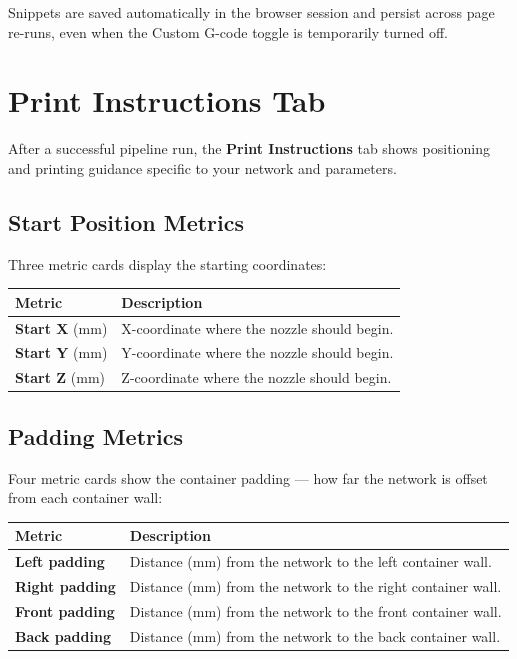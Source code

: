 \documentclass[11pt,letterpaper]{article}
\newcommand{\gui}[1]{\textcolor{guicolor}{\textsf{\textbf{#1}}}}
\begin{document}
\begin{tipbox}
Snippets are saved automatically in the browser session and persist across
page re-runs, even when the Custom G-code toggle is temporarily turned off.
\end{tipbox}

\section{Print Instructions Tab}
\label{sec:instructions}

After a successful pipeline run, the \gui{Print Instructions} tab shows
positioning and printing guidance specific to your network and parameters.

\subsection{Start Position Metrics}

Three metric cards display the starting coordinates:

\begin{tabularx}{\textwidth}{l X}
\toprule
\textbf{Metric} & \textbf{Description} \\
\midrule
\gui{Start X} (mm) & X-coordinate where the nozzle should begin. \\
\gui{Start Y} (mm) & Y-coordinate where the nozzle should begin. \\
\gui{Start Z} (mm) & Z-coordinate where the nozzle should begin. \\
\bottomrule
\end{tabularx}

\subsection{Padding Metrics}

Four metric cards show the container padding --- how far the network is offset
from each container wall:

\begin{tabularx}{\textwidth}{l X}
\toprule
\textbf{Metric} & \textbf{Description} \\
\midrule
\gui{Left padding} & Distance (mm) from the network to the left container wall. \\
\gui{Right padding} & Distance (mm) from the network to the right container wall. \\
\gui{Front padding} & Distance (mm) from the network to the front container wall. \\
\gui{Back padding} & Distance (mm) from the network to the back container wall. \\
\bottomrule
\end{tabularx}
\end{document}
